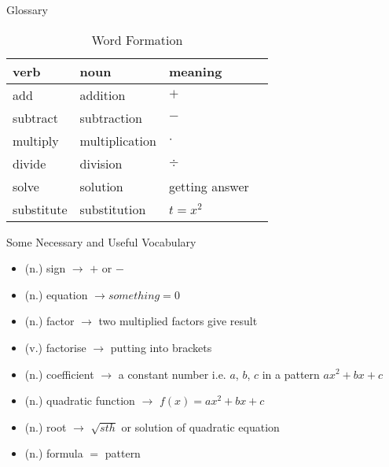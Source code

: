 \documentclass[final]{beamer}
\newlength{\onecolwid}
\begin{document}
\begin{frame}[t]
\begin{columns}[t]
\begin{column}{\onecolwid}
            \begin{block}{Glossary}

                \begin{table}
                    \vspace{2ex}
                    \begin{tabular}{l l l l}
                        \toprule
                        \textbf{verb} & \textbf{noun}  & \textbf{meaning} \\
                        \midrule
                        add           & addition       & $+$              \\
                        subtract      & subtraction    & $-$              \\
                        multiply      & multiplication & $\cdot$          \\
                        divide        & division       & $\div$           \\
                        solve         & solution       & getting answer   \\
                        substitute    & substitution   & $t=x^2$          \\



                        \bottomrule
                    \end{tabular}
                    \caption{Word Formation}
                \end{table}


            \end{block}


            \begin{alertblock}{Some Necessary and Useful Vocabulary}

                \begin{itemize}
                    \item (n.) sign $\rightarrow$ $+$ or $-$
                    \item (n.) equation $\rightarrow something = 0$
                    \item (n.) factor $\rightarrow$ two multiplied factors give result
                    \item (v.) factorise $\rightarrow$ putting into brackets
                    \item (n.) coefficient $\rightarrow$ a constant number i.e. $a$, $b$, $c$ in a pattern $ax^2+bx+c$
                    \item (n.) quadratic function $\rightarrow$ $f(x) = ax^2+bx+c$
                    \item (n.) root $\rightarrow$ $\sqrt{sth}$ or solution of quadratic equation
                    \item (n.) formula $=$ pattern
                \end{itemize}


\end{alertblock}
\end{column}
\end{columns}
\end{frame}
\end{document}
